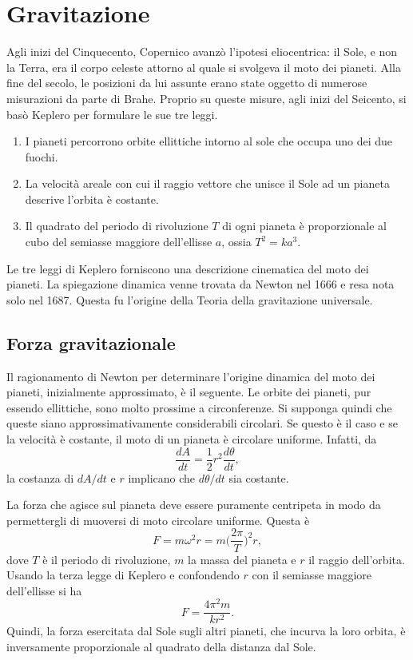 \chapter{Gravitazione}
Agli inizi del Cinquecento, Copernico avanzò l'ipotesi eliocentrica: il Sole, e non la Terra, era il corpo celeste attorno al quale si svolgeva il moto dei pianeti. Alla fine del secolo, le posizioni da lui assunte erano state oggetto di numerose misurazioni da parte di Brahe. Proprio su queste misure, agli inizi del Seicento, si basò Keplero per formulare le sue tre leggi.
\begin{teo}\hfill
    \begin{enumerate}
        \item I pianeti percorrono orbite ellittiche intorno al sole che occupa uno dei due fuochi.
        \item La velocità areale con cui il raggio vettore che unisce il Sole ad un pianeta descrive l'orbita è costante.
        \item Il quadrato del periodo di rivoluzione $T$ di ogni pianeta è proporzionale al cubo del semiasse maggiore dell'ellisse $a$, ossia $T^2=ka^3$.
    \end{enumerate}
\end{teo}
Le tre leggi di Keplero forniscono una descrizione cinematica del moto dei pianeti. La spiegazione dinamica venne trovata da Newton nel 1666 e resa nota solo nel 1687. Questa fu l'origine della Teoria della gravitazione universale.

\section{Forza gravitazionale}
Il ragionamento di Newton per determinare l'origine dinamica del moto dei pianeti, inizialmente approssimato, è il seguente. Le orbite dei pianeti, pur essendo ellittiche, sono molto prossime a circonferenze. Si supponga quindi che queste siano approssimativamente considerabili circolari. Se questo è il caso e se la velocità è costante, il moto di un pianeta è circolare uniforme. Infatti, da
\begin{equation}
    \frac{dA}{dt}=\frac{1}{2}r^2\frac{d\theta}{dt},
\end{equation}
la costanza di $dA/dt$ e $r$ implicano che $d\theta/dt$ sia costante.

La forza che agisce sul pianeta deve essere puramente centripeta in modo da permettergli di muoversi di moto circolare uniforme. Questa è
\begin{equation}
    F=m\omega^2r=m\bigg(\frac{2\pi}{T}\bigg)^2r,
\end{equation}
dove $T$ è il periodo di rivoluzione, $m$ la massa del pianeta e $r$ il raggio dell'orbita. Usando la terza legge di Keplero e confondendo $r$ con il semiasse maggiore dell'ellisse si ha
\begin{equation}
    F=\frac{4\pi^2m}{kr^2}.
\end{equation}
Quindi, la forza esercitata dal Sole sugli altri pianeti, che incurva la loro orbita, è inversamente proporzionale al quadrato della distanza dal Sole. 

